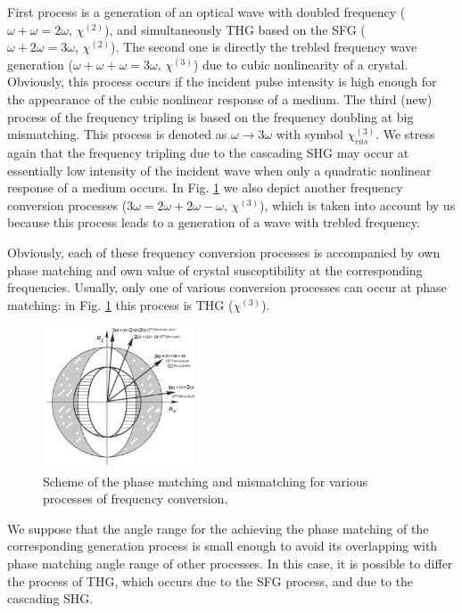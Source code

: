 \documentclass[a4paper, 12pt, onecolumn]{extarticle}
\begin{document}
First process is a generation of an optical wave with doubled frequency (\(\omega+\omega=2\omega,\,\chi^{(2)}\)), and simultaneously THG based on the SFG (\(\omega+2\omega=3\omega,\,\chi^{(2)}\)). The second one is directly the trebled frequency wave generation (\(\omega+\omega+\omega=3\omega,\,\chi^{(3)}\)) due to cubic nonlinearity of a crystal. Obviously, this process occurs if the incident pulse intensity is high enough for the appearance of the cubic nonlinear response of a medium. The third (new) process of the frequency tripling is based on the frequency doubling at big mismatching. This process is denoted as \(\omega\rightarrow3\omega\) with symbol \(\chi^{(3)}_{cas}\). We stress again that the frequency tripling due to the cascading SHG may occur at essentially low intensity of the incident wave when only a quadratic nonlinear response of a medium occurs. In Fig. \ref{fr:match} we also depict another frequency conversion processes (\(3\omega=2\omega+2\omega-\omega,\,\chi^{(3)}\)), which is taken into account by us because this process leads to a generation of a wave with trebled frequency. 

Obviously, each of these frequency conversion processes is accompanied by own phase matching and own value of crystal susceptibility at the corresponding frequencies. Usually, only one of various conversion processes can occur at phase matching: in Fig. \ref{fr:match} this process is THG ($\chi^{(3)}$).
\begin{figure}[h!]
\centering
\includegraphics[width=0.4\textwidth]{Matching2}
\caption{Scheme of the phase matching and mismatching for various processes of frequency conversion.}
\label{fr:match}
\end{figure}
We suppose that the angle range for the achieving the phase matching of the corresponding generation process is small enough to avoid its overlapping with phase matching angle range of other processes. In this case, it is possible to differ the process of THG, which occurs due to the SFG process, and due to the cascading SHG.
\end{document}
